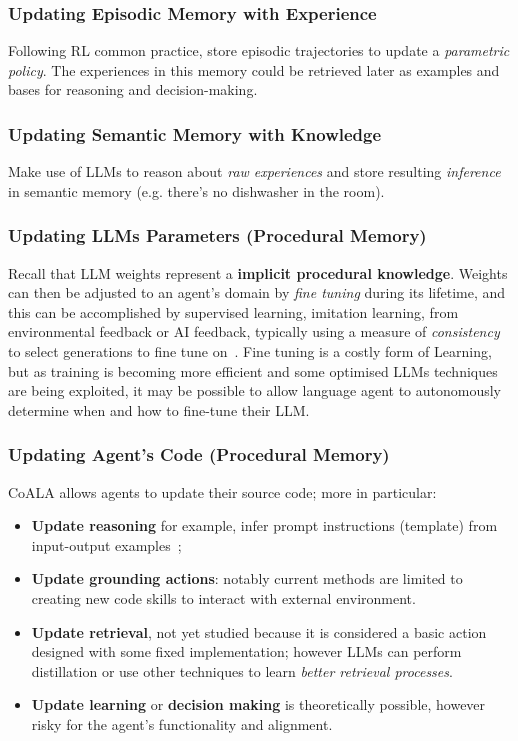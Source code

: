 \subsubsection{Updating Episodic Memory with Experience}
Following \ac{RL} common practice, store episodic trajectories to update a
\emph{parametric policy}. The experiences in this memory could be retrieved
later as examples and bases for reasoning and decision-making.

\subsubsection{Updating Semantic Memory with Knowledge}
Make use of \ac{LLM}s to reason about \emph{raw experiences} and store
resulting \emph{inference} in semantic memory (e.g. there's no dishwasher in
the room).

\subsubsection{Updating LLMs Parameters (Procedural Memory)}
Recall that \ac{LLM} weights represent a \textbf{implicit procedural
knowledge}. Weights can then be adjusted to an agent's domain by \emph{fine
tuning} during its lifetime, and this can be accomplished by supervised
learning, imitation learning, from environmental feedback or AI feedback,
typically using a measure of \emph{consistency} to select generations to fine
tune on~\cite{wang2023selfconsistencyimproveschainthought}. Fine tuning is a
costly form of Learning, but as training is becoming more efficient and some
optimised \ac{LLM}s techniques are being exploited, it may be possible to allow
language agent to autonomously determine when and how to fine-tune their
\ac{LLM}.

\subsubsection{Updating Agent's Code (Procedural Memory)}
\ac{CoALA} allows agents to update their source code; more in particular:
\begin{itemize}
    \item \textbf{Update reasoning} for example, infer prompt instructions
        (template) from input-output
        examples~\cite{zhou2023largelanguagemodelshumanlevel};
    \item \textbf{Update grounding actions}: notably current methods are limited
        to creating new code skills to interact with external environment.
    \item \textbf{Update retrieval}, not yet studied because it is considered a
        basic action designed with some fixed implementation; however \ac{LLM}s
        can perform distillation or use other techniques to learn \emph{better
        retrieval processes}.
    \item \textbf{Update learning} or \textbf{decision making} is theoretically
        possible, however risky for the agent's functionality and alignment.
\end{itemize}

